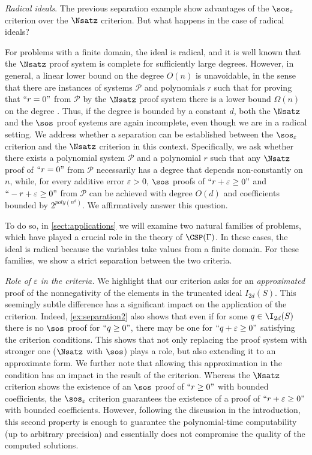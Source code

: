 \documentclass[11pt]{article}
\begin{document}
\textit{Radical ideals}. The previous separation example show advantages of the $\sos_{\varepsilon}$ criterion over the $\Nsatz$ criterion. But what happens in the case of radical ideals? 

For problems with a finite domain, the ideal is radical, and it is well known that the $\Nsatz$ proof system is complete for sufficiently large degrees. 
However, in general, a linear lower bound on the degree $O(n)$ is unavoidable, in the sense that there are instances of systems $\mathcal{P}$ and polynomials $r$ such that for proving that $``r=0"$ from $\mathcal{P}$ by the $\Nsatz$ proof system there is a lower bound $\Omega(n)$ on the degree \cite{Buss96}. Thus, if the degree is bounded by a constant $d$, both the $\Nsatz$ and the $\sos$ proof systems are again incomplete, even though we are in a radical setting. We address whether a separation can be established between the \(\sos_{\varepsilon}\) criterion and the \(\Nsatz\) criterion in this context. Specifically, we ask whether there exists a polynomial system \(\mathcal{P}\) and a polynomial \(r\) such that any \(\Nsatz\) proof of \(``r = 0"\) from \(\mathcal{P}\) necessarily has a degree that depends non-constantly on \(n\), while, for every additive error \(\varepsilon > 0\), \(\sos\) proofs of \(``r + \varepsilon \geq 0"\) and \(``-r + \varepsilon \geq 0"\) from \(\mathcal{P}\) can be achieved with degree \(O(d)\) and coefficients bounded by \(2^{poly(n^d)}\). We affirmatively answer this question.

To do so, in \cref{sect:applications} we will examine two natural families of problems, which have played a crucial role in the theory of $\CSP(\Gamma)$. In these cases, the ideal is radical because the variables take values from a finite domain. For these families, we show a strict separation between the two criteria.

\emph{Role of $\varepsilon$ in the criteria.} We highlight that our criterion asks for an {\em approximated} proof of the nonnegativity of the elements in the truncated ideal $I_{2d}(S)$. This seemingly subtle difference has a significant impact on the application of the criterion.
Indeed, \cref{ex:separation2} also shows that even if for some $q\in \I_{2d}(S)$ there is no $\sos$ proof for $``q\geq 0"$, there may be one for $``q+\varepsilon\geq 0"$ satisfying the criterion conditions. This shows that not only replacing the proof system with stronger one ($\Nsatz$ with $\sos$) plays a role, but also extending it to an approximate form. 
%
We further note that allowing this approximation in the condition has an impact in the result of the criterion. Whereas the $\Nsatz$ criterion shows the existence of an $\sos$ proof of $``r\geq 0"$ with bounded coefficients, the  $\sos_{\varepsilon}$ criterion guarantees the existence of a proof of $``r+\varepsilon\geq 0"$ with bounded coefficients. However, following the discussion in the introduction, this second property is enough to guarantee the polynomial-time computability (up to arbitrary precision) and essentially does not compromise the quality of the computed solutions. 
\end{document}
